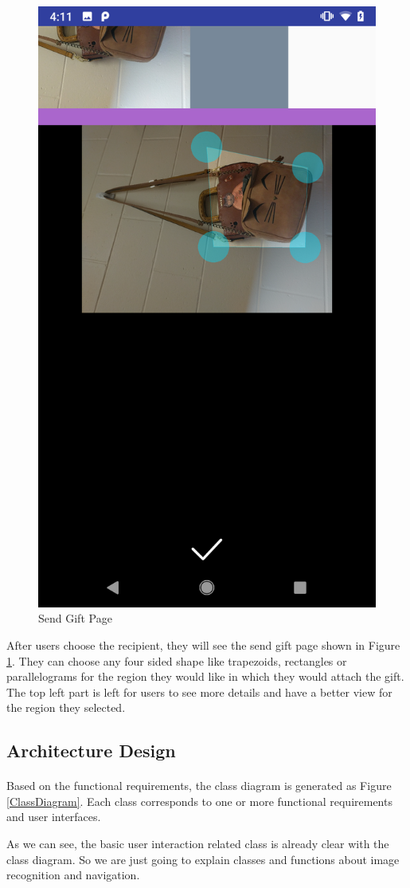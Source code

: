 \begin{figure}[ht]
\centering
\includegraphics[width=.27\textwidth]{section03/assets/SendGift.png}
\caption[Short Caption 2]{\label{SendGiftUI}Send Gift Page}
\end{figure}
\par After users choose the recipient, they will see the send gift page shown in Figure \ref{SendGiftUI}. They can choose any four sided shape like trapezoids, rectangles or parallelograms for the region they would like in which they would attach the gift. The top left part is left for users to see more details and have a better view for the region they selected.

\subsection{Architecture Design}
\paragraph{}Based on the functional requirements, the class diagram is generated as Figure \ref{ClassDiagram}. Each class corresponds to one or more functional requirements and user interfaces.
\par As we can see, the basic user interaction related class is already clear with the class diagram. So we are just going to explain classes and functions about image recognition and navigation.

